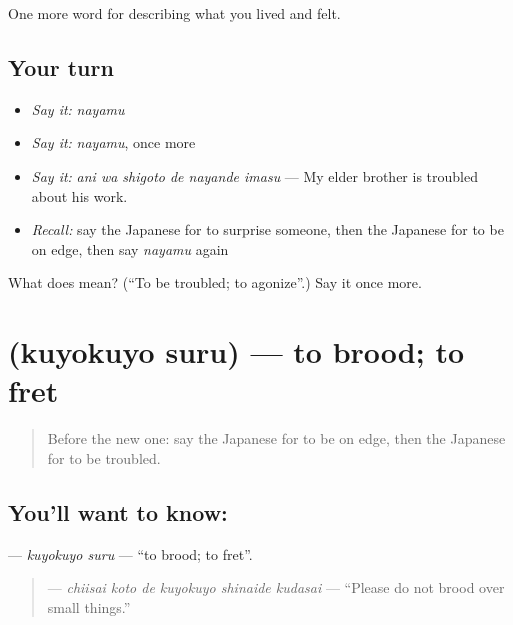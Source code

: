 \begin{grammarlens}[title={What you've built}]
One more word for describing what you lived and felt.
\end{grammarlens}

\subsection*{Your turn}
\begin{itemize}
\raggedright
  \item \emph{Say it:} \emph{nayamu}
  \item \emph{Say it:} \emph{nayamu}, once more
  \item \emph{Say it:} \emph{ani wa shigoto de nayande imasu} — My elder brother is troubled about his work.
  \item \emph{Recall:} say the Japanese for to surprise someone, then the Japanese for to be on edge, then say \emph{nayamu} again
\end{itemize}

\begin{tcolorbox}[breakable,colback=teal!4,colframe=teal!35!black,title={Before you move on}]
What does  mean? (\textquotedblleft{}To be troubled; to agonize\textquotedblright{}.) Say it once more.
\end{tcolorbox}
\section[\texorpdfstring{\ja{くよくよする} (kuyokuyo suru)}{くよくよする (kuyokuyo suru)}]{ (kuyokuyo suru) — to brood; to fret}

\label{lesson:JA-C432-kuyokuyo-suru}



\begin{quote}
Before the new one: say the Japanese for to be on edge, then the Japanese for to be troubled.
\end{quote}

\subsection*{You'll want to know: }
\textbf{} — \emph{kuyokuyo suru} — \textquotedblleft{}to brood; to fret\textquotedblright{}.

\begin{quote}
\textbf{   } — \emph{chiisai koto de kuyokuyo shinaide kudasai} — \textquotedblleft{}Please do not brood over small things.\textquotedblright{}
\end{quote}

